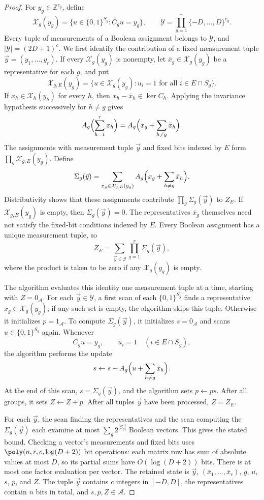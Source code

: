 \begin{proof}
For $y_g\in\mathbb Z^{c_g}$, define
\[
 \mathcal X_g(y_g)=\{u\in\{0,1\}^{S_g}:C_gu=y_g\},
 \qquad
 \mathcal Y=\prod_{g=1}^r\{-D,\ldots,D\}^{c_g}.
\]
Every tuple of measurements of a Boolean assignment belongs to
$\mathcal Y$, and $|\mathcal Y|=(2D+1)^c$.
We first identify the contribution of a fixed measurement tuple
$\vec y=(y_1,\ldots,y_r)$. If every $\mathcal X_g(y_g)$ is nonempty,
let $\bar x_g\in\mathcal X_g(y_g)$ be a representative for each $g$,
and put
\[
 \mathcal X_{g,E}(y_g)=
 \{u\in\mathcal X_g(y_g):u_i=1\text{ for all }i\in E\cap S_g\}.
\]
If $x_h\in\mathcal X_h(y_h)$ for every $h$, then
$x_h-\bar x_h\in\ker C_h$. Applying the invariance hypothesis
successively for $h\ne g$ gives
\[
 A_g\Bigl(\sum_{h=1}^r x_h\Bigr)
 =A_g\Bigl(x_g+\sum_{h\ne g}\bar x_h\Bigr).
\]
The assignments with measurement tuple $\vec y$ and fixed bits indexed
by $E$ form $\prod_g\mathcal X_{g,E}(y_g)$. Define
\begin{equation}\label{eq:group-sum}
 \Sigma_g(\vec y)=\sum_{x_g\in\mathcal X_{g,E}(y_g)}
       A_g\Bigl(x_g+\sum_{h\ne g}\bar x_h\Bigr).
\end{equation}
Distributivity shows that these assignments contribute
$\prod_g\Sigma_g(\vec y)$ to $Z_E$. If $\mathcal X_{g,E}(y_g)$ is empty,
then $\Sigma_g(\vec y)=0$. The representatives $\bar x_g$ themselves
need not satisfy the fixed-bit conditions indexed by $E$.
Every Boolean assignment has a unique measurement tuple, so
\[
 Z_E=\sum_{\vec y\in\mathcal Y}\prod_{g=1}^r\Sigma_g(\vec y),
\]
where the product is taken to be zero if any $\mathcal X_g(y_g)$
is empty.

The algorithm evaluates this identity one measurement tuple at a
time, starting with $Z=0_{\mathcal A}$. For each $\vec y\in\mathcal Y$,
a first scan of each $\{0,1\}^{S_g}$ finds a representative
$\bar x_g\in\mathcal X_g(y_g)$; if any such set is empty, the
algorithm skips this tuple. Otherwise it initializes
$p=1_{\mathcal A}$. To compute $\Sigma_g(\vec y)$, it initializes
$s=0_{\mathcal A}$ and scans $u\in\{0,1\}^{S_g}$ again. Whenever
\[
 C_gu=y_g,\qquad u_i=1\quad(i\in E\cap S_g),
\]
the algorithm performs the update
\[
 s\leftarrow s+A_g\Bigl(u+\sum_{h\ne g}\bar x_h\Bigr).
\]
At the end of this scan, $s=\Sigma_g(\vec y)$, and the algorithm sets
$p\leftarrow ps$. After all groups, it sets $Z\leftarrow Z+p$.
After all tuples $\vec y$ have been processed, $Z=Z_E$.

For each $\vec y$, the scan finding the representatives and the scan
computing the $\Sigma_g(\vec y)$ each examine at most
$\sum_g2^{|S_g|}$ Boolean vectors. This gives the stated bound.
Checking a vector's measurements and fixed bits uses
$\poly(n,r,c,\log(D+2))$ bit operations: each matrix row has sum of
absolute values at most $D$, so its partial sums have
$O(\log(D+2))$ bits. There is at most one factor evaluation per vector.
The retained state is $\vec y$, $(\bar x_1,\ldots,\bar x_r)$, $g$, $u$,
$s$, $p$, and $Z$. The tuple $\vec y$ contains $c$ integers in $[-D,D]$,
the representatives contain $n$ bits in total, and $s,p,Z\in\mathcal A$.
\end{proof}

